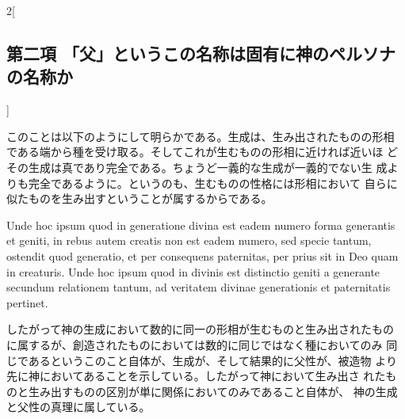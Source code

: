 \documentclass[paper=a4paper,fontsize=10pt,jafontsize=9pt,titlepage]{jlreq}
\begin{document}
\begin{paracol}{2}[\subsection{第二項 「父」というこの名称は固有に神のペルソナの名称か}]
\switchcolumn


このことは以下のようにして明らかである。生成は、生み出されたものの形相
 である端から種を受け取る。そしてこれが生むものの形相に近ければ近いほ
 どその生成は真であり完全である。ちょうど一義的な生成が一義的でない生
 成よりも完全であるように。というのも、生むものの性格には形相において
 自らに似たものを生み出すということが属するからである。


\switchcolumn*


Unde hoc ipsum quod in
generatione divina est eadem numero forma generantis et geniti, in
rebus autem creatis non est eadem numero, sed specie tantum, ostendit
quod generatio, et per consequens paternitas, per prius sit in Deo
quam in creaturis. Unde hoc ipsum quod in divinis est distinctio
geniti a generante secundum relationem tantum, ad veritatem divinae
generationis et paternitatis pertinet.


\switchcolumn


したがって神の生成において数的に同一の形相が生むものと生み出されたもの
 に属するが、創造されたものにおいては数的に同じではなく種においてのみ
 同じであるというこのこと自体が、生成が、そして結果的に父性が、被造物
 より先に神においてあることを示している。したがって神において生み出さ
 れたものと生み出すものの区別が単に関係においてのみであること自体が、
 神の生成と父性の真理に属している。


\switchcolumn*



\end{paracol}
\newpage


\end{document}
